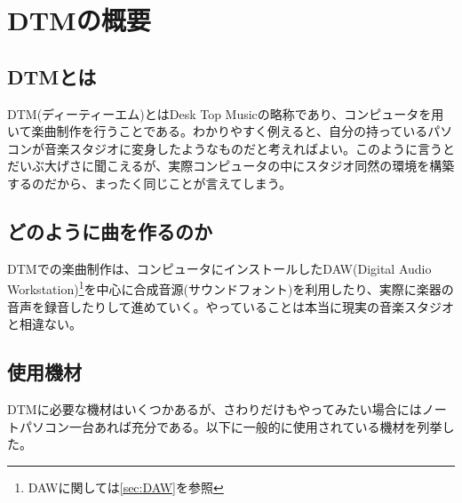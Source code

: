 \documentclass[ams]{U-AizuGT}
\begin{document}
\section{DTMの概要}
\subsection{DTMとは}
\label{sec:aboutdtm}
DTM(ディーティーエム)とはDesk Top Musicの略称であり、コンピュータを用いて楽曲制作を行うことである。わかりやすく例えると、自分の持っているパソコンが音楽スタジオに変身したようなものだと考えればよい。このように言うとだいぶ大げさに聞こえるが、実際コンピュータの中にスタジオ同然の環境を構築するのだから、まったく同じことが言えてしまう。\\
\subsection{どのように曲を作るのか}
\label{sec:howmake}
DTMでの楽曲制作は、コンピュータにインストールしたDAW(Digital Audio Workstation)\footnote{DAWに関しては\ref{sec:DAW}を参照}を中心に合成音源(サウンドフォント)を利用したり、実際に楽器の音声を録音したりして進めていく。やっていることは本当に現実の音楽スタジオと相違ない。\\
\subsection{使用機材}
DTMに必要な機材はいくつかあるが、さわりだけもやってみたい場合にはノートパソコン一台あれば充分である。以下に一般的に使用されている機材を列挙した。\\
\end{document}
